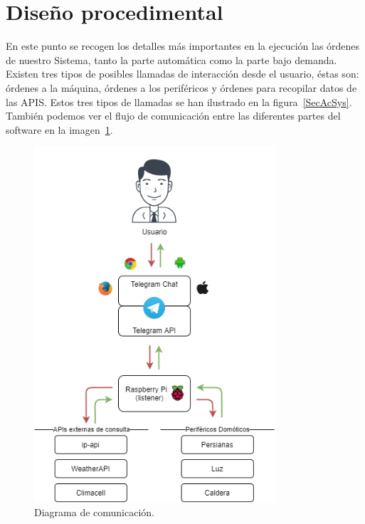 \section{Diseño procedimental}
En este punto se recogen los detalles más importantes en la ejecución las órdenes de nuestro Sistema, tanto la parte automática como la parte bajo demanda. Existen tres tipos de posibles llamadas de interacción desde el usuario, éstas son: órdenes a la máquina, órdenes a los periféricos y órdenes para recopilar datos de las APIS. Estos tres tipos de llamadas se han ilustrado en la figura~\ref{SecAcSys}. También podemos ver el flujo de comunicación entre las diferentes partes del software en la imagen~\ref{Arquitectura}.

\begin{figure}[h]
\centering
\includegraphics[width=0.8\textwidth]{img/Diagramas/arquitectura.png}
\caption{Diagrama de comunicación.}\label{Arquitectura}
\end{figure}


\begin{landscape}
\label{SecAcSys}
\end{landscape}

